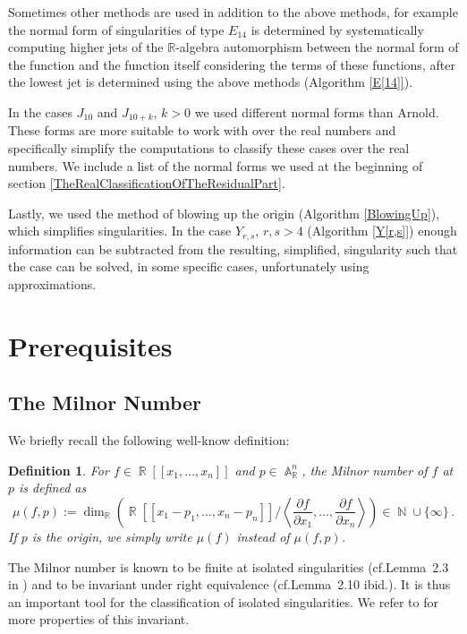 \documentclass[noend]{amsproc}
\newtheorem{defn}[theorem]{Definition}
\DeclareMathOperator{\N}{\mathbb{N}}
\DeclareMathOperator{\R}{\mathbb{R}}
\DeclareMathOperator{\A}{\mathbb{A}}
\begin{document}
Sometimes other methods are used in addition to the above methods, for example
the normal form of singularities of type $E_{14}$ is determined by
systematically computing higher jets of the $\mathbb R$-algebra automorphism
between the normal form of the function and the function itself considering the
terms of these functions, after the lowest jet is determined using the above
methods (Algorithm \ref{E[14]}).

In the cases $J_{10}$ and $J_{10+k}$, $k>0$ we used different normal forms than
Arnold. These forms are more suitable to work with over the real numbers and
specifically simplify the computations to classify these cases over the real
numbers. We include a list of the normal forms we used at the beginning of
section \ref{TheRealClassificationOfTheResidualPart}.

Lastly, we used the method of blowing up the origin (Algorithm
\ref{BlowingUp}), which simplifies singularities. In the case $Y_{r,s}$,
$r,s>4$ (Algorithm \ref{Y[r,s]}) enough information can be subtracted from the
resulting, simplified, singularity such that the case can be solved, in some
specific cases, unfortunately using approximations.


\section{Prerequisites}

\subsection{The Milnor Number}

We briefly recall the following well-know definition:

\begin{defn}
For $f \in \R[[x_1,\ldots,x_n]]$ and $p \in \A_{\R}^n$, the
\emph{Milnor number} of $f$ at $p$ is defined as
\[
\mu(f, p) := \dim_{\R}
\left( \R[[x_1-p_1, \ldots, x_n-p_n]] \bigg/
\left\langle \frac{\partial f}{\partial x_1}, \ldots,
\frac{\partial f}{\partial x_n} \right\rangle \right)
\in \N \cup \{\infty\} \,.
\]
If $p$ is the origin, we simply write $\mu(f)$ instead of $\mu(f, p)$.
\end{defn}

The Milnor number is known to be finite at isolated singularities
(cf.\@ Lemma~2.3 in \cite{GLS2007}) and to be invariant under right equivalence
(cf.\@ Lemma~2.10 ibid.). It is thus an important tool for the classification
of isolated singularities. We refer to \cite{GLS2007} for more properties of
this invariant.
\end{document}

